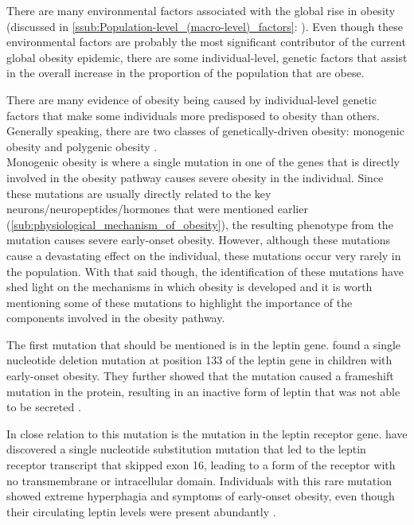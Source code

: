 There are many environmental factors associated with the global rise in obesity (discussed in \cref{ssub:Population-level_(macro-level)_factors}: ).
Even though these environmental factors are probably the most significant contributor of the current global obesity epidemic, there are some individual-level, genetic factors that assist in the overall increase in the proportion of the population that are obese.

There are many evidence of obesity being caused by individual-level genetic factors that make some individuals more predisposed to obesity than others.
Generally speaking, there are two classes of genetically-driven obesity: monogenic obesity and polygenic obesity \citep{Moustafa2013}. \\

\noindent
Monogenic obesity is where a single mutation in one of the genes that is directly involved in the obesity pathway causes severe obesity in the individual.
Since these mutations are usually directly related to the key neurons/neuropeptides/hor\-mones that were mentioned earlier (\cref{sub:physiological_mechanism_of_obesity}), the resulting phenotype from the mutation causes severe early-onset obesity.
However, although these mutations cause a devastating effect on the individual, these mutations occur very rarely in the population.
With that said though, the identification of these mutations have shed light on the mechanisms in which obesity is developed and it is worth mentioning some of these mutations to highlight the importance of the components involved in the obesity pathway.

The first mutation that should be mentioned is in the leptin gene.
\citet{Montague1997} found a single nucleotide deletion mutation at position 133 of the leptin gene in children with early-onset obesity.
They further showed that the mutation caused a frameshift mutation in the protein, resulting in an inactive form of leptin that was not able to be secreted \citep{Montague1997}.

In close relation to this mutation is the mutation in the leptin receptor gene.
\citet{Clement1998} have discovered a single nucleotide substitution mutation that led to the leptin receptor transcript that skipped exon 16, leading to a form of the receptor with no transmembrane or intracellular domain.
Individuals with this rare mutation showed extreme hyperphagia and symptoms of early-onset obesity, even though their circulating leptin levels were present abundantly \citep{Clement1998}.

